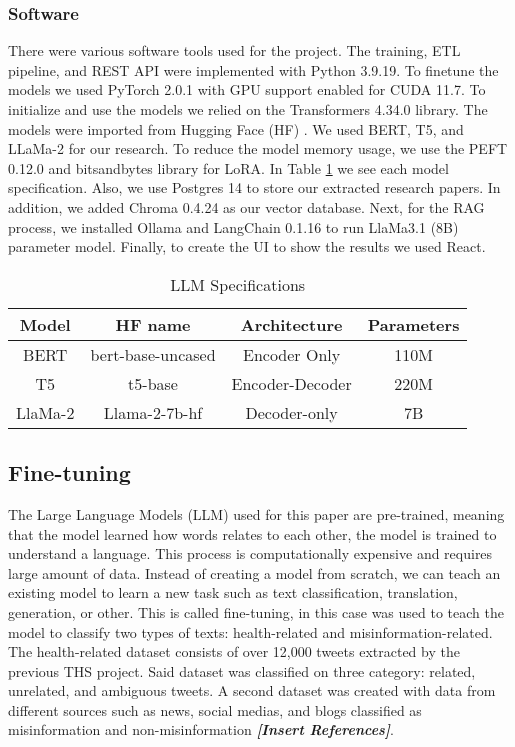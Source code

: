 \subsubsection{Software}
There were various software tools used for the project. The training, ETL pipeline, and REST API were implemented with Python 3.9.19. To finetune the models we used PyTorch 2.0.1 with GPU support enabled for
CUDA 11.7. To initialize and use the models we relied on  the Transformers 4.34.0 library. The models were imported from Hugging Face (HF) \cite{huggingface}. We used BERT, T5, and LLaMa-2 for our research. To reduce the model memory usage, we use the PEFT 0.12.0 and bitsandbytes library for LoRA. In Table \ref{table:LLM} we see each model specification. Also, we use Postgres 14 to store our extracted research papers. In addition, we added Chroma 0.4.24 as our vector database. Next, for the RAG process, we installed Ollama \cite{ollama} and LangChain 0.1.16 to run LlaMa3.1 (8B) \cite{touvron2023llamaopenefficientfoundation} parameter model. Finally, to create the UI to show the results we used React.

  \begin{table}[ht!]
\centering
\caption{LLM Specifications}
{\scriptsize
\begin{tabular}{||c | c | c | c||} 
 \hline
\textbf{Model} & \textbf{HF name} & \textbf{Architecture} & \textbf{Parameters} \\ [0.5ex] 
 \hline
 BERT & bert-base-uncased & Encoder Only & 110M \\ 
 \hline
 T5 & t5-base & Encoder-Decoder & 220M \\
 \hline
 LlaMa-2 & Llama-2-7b-hf & Decoder-only & 7B \\
 \hline
\end{tabular}
}
\label{table:LLM}
\end{table}

\subsection{Fine-tuning}

The Large Language Models (LLM) used for this paper are pre-trained, meaning that the model learned how words relates to each other, the model is trained to understand a language. This process is computationally expensive and requires large amount of data. Instead of creating a model from scratch, we can teach an existing model to learn a new task such as text classification, translation, generation, or other. This is called fine-tuning, in this case was used to teach the model to classify two types of texts: health-related and misinformation-related. 
\newline
\newline
The health-related dataset consists of over 12,000 tweets extracted by the previous THS project. Said dataset was classified on three category: related, unrelated, and ambiguous tweets. A second dataset was created with data from different sources such as news, social medias, and blogs classified as misinformation and non-misinformation \textbf{\textit{[Insert References]}}. 

